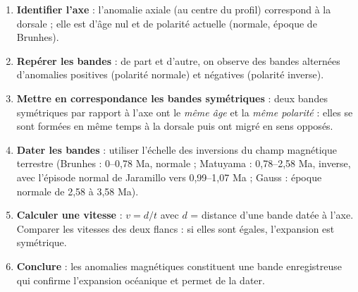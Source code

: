 \documentclass[11pt]{article}
\newcommand{\cle}[1]{{\popxbold\color{popdark}#1}}
\begin{document}
\begin{methode}
\begin{enumerate}
\item \textbf{Identifier l'axe} : l'anomalie axiale (au centre du profil) correspond à la dorsale ; elle est d'âge nul et de polarité actuelle (normale, époque de Brunhes).
\item \textbf{Repérer les bandes} : de part et d'autre, on observe des bandes alternées d'anomalies positives (polarité normale) et négatives (polarité inverse).
\item \textbf{Mettre en correspondance les bandes symétriques} : deux bandes symétriques par rapport à l'axe ont le \emph{même âge} et la \emph{même polarité} : elles se sont formées en même temps à la dorsale puis ont migré en sens opposés.
\item \textbf{Dater les bandes} : utiliser l'échelle des inversions du champ magnétique terrestre (Brunhes : 0--0,78 Ma, normale ; Matuyama : 0,78--2,58 Ma, inverse, avec l'épisode normal de Jaramillo vers 0,99--1,07 Ma ; Gauss : époque normale de 2,58 à 3,58 Ma).
\item \textbf{Calculer une vitesse} : $v = d/t$ avec $d$ = distance d'une bande datée à l'axe. Comparer les vitesses des deux flancs : si elles sont égales, l'expansion est symétrique.
\item \textbf{Conclure} : les anomalies magnétiques constituent une \cle{bande enregistreuse} qui confirme l'expansion océanique et permet de la dater.
\end{enumerate}
\end{methode}
\end{document}
